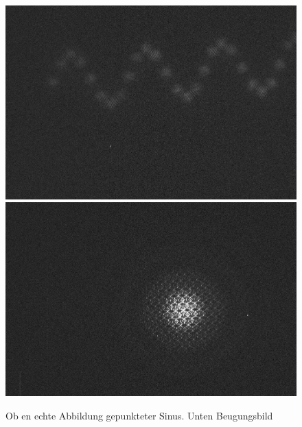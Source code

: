 \begin{figure}[h]
	\centering
	\includegraphics[width=\textwidth]{Daten/sindot_1.jpg}
	\includegraphics[width=\textwidth]{Daten/sindot_2.jpg}
	\caption[Aufnahme gepunkteter Sinus]{Ob
		en echte Abbildung gepunkteter Sinus. Unten Beugungsbild}
\end{figure}
